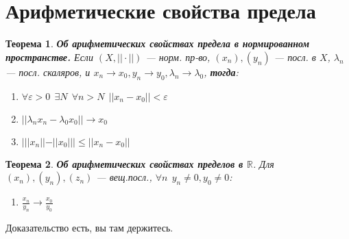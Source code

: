 \documentclass[12pt]{article}
\theoremstyle{plain}
\newtheorem{theorem}{Теорема}
\theoremstyle{remark}
\theoremstyle{definition}
\begin{document}
\section*{Арифметические свойства предела}

\begin{theorem}
\textbf{Об арифметических свойствах предела в нормированном пространстве.}
Если $(X, ||\cdot||)$ --- норм. пр-во, $(x_n),(y_n)$ --- посл. в $X$, $\lambda_n$ ---
посл. скаляров, и $x_n\to x_0, y_n\to y_0, \lambda_n\to \lambda_0$, \textbf{тогда}:
\begin{enumerate}
\item $\forall \varepsilon>0 \ \ \exists N \ \ \forall n>N \ \ ||x_n-x_0||<\varepsilon$
\item $||\lambda_nx_n-\lambda_0x_0||\to x_0$
\item $|||x_n||-||x_0|||\leq||x_n-x_0||$
\end{enumerate}
\end{theorem}

\begin{theorem}
\textbf{Об арифметических свойствах пределов в $\mathbb{R}$}. Для $(x_n),(y_n),(z_n)$ 
--- вещ.посл., $\forall n \ \ y_n\not =0, y_0\not = 0$:
\begin{enumerate}[resume]
\item $\frac{x_n}{y_n}\to\frac{x_0}{y_0}$
\end{enumerate}
\end{theorem}

Доказательство есть, вы там держитесь.
\end{document}
